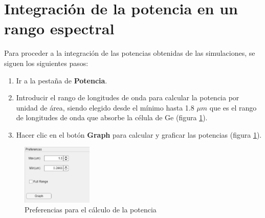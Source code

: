 \section{Integraci\'{o}n de la potencia en un rango espectral}
Para proceder a la integración de las potencias obtenidas de las simulaciones, se siguen los siguientes pasos:
	\begin{enumerate}
	\item Ir a la pestaña de \textbf{Potencia}.
	\item Introducir el rango de longitudes de onda para calcular la potencia por unidad de área, siendo elegido desde el mínimo hasta 1.8 $\mu m$ que es el rango de longitudes de onda que absorbe la célula de Ge (figura \ref{fig:graficar_ejemplo2}).
	\item Hacer clic en el botón \textbf{Graph} para calcular y graficar las potencias (figura \ref{fig:graficar_ejemplo2}).
\end{enumerate}
\begin{figure}[H]
	\centering
	\includegraphics[width=0.30\textwidth]{figuras/Procedimiento_Simulaciones/Radiacion/graficar_ejemplo2.png}
	\caption{Preferencias para el cálculo de la potencia}
	\label{fig:graficar_ejemplo2}
\end{figure}
